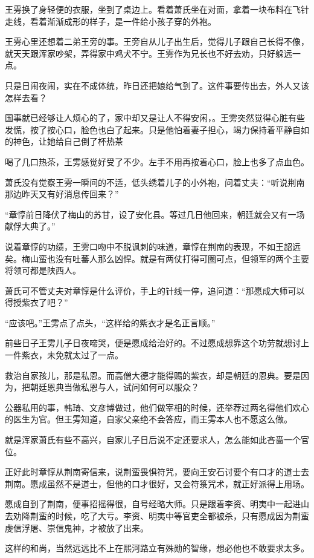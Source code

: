 王雱换了身轻便的衣服，坐到了桌边上。看着萧氏坐在对面，拿着一块布料在飞针走线，看着渐渐成形的样子，是一件给小孩子穿的外袍。

王雱心里还想着二弟王旁的事。王旁自从儿子出生后，觉得儿子跟自己长得不像，就天天跟浑家吵架，弄得家中鸡犬不宁。王雱作为兄长也不好去劝，只好躲远一点。

只是日闹夜闹，实在不成体统，昨日还把娘给气到了。这件事要传出去，外人又该怎样去看？

国事就已经够让人烦心的了，家中却又是让人不得安闲，。王雱突然觉得心脏有些发慌，按了按心口，脸色也白了起来。只是他怕着妻子担心，竭力保持着平静自如的神色，让她给自己倒了杯热茶

喝了几口热茶，王雱感觉好受了不少。左手不用再按着心口，脸上也多了点血色。

萧氏没有觉察王雱一瞬间的不适，低头绣着儿子的小外袍，问着丈夫：“听说荆南那边昨天又有好消息传回来？”

“章惇前日降伏了梅山的苏甘，设了安化县。等过几日他回来，朝廷就会又有一场献俘大典了。”

说着章惇的功绩，王雱口吻中不脱讽刺的味道，章惇在荆南的表现，不如王韶远矣。梅山蛮也没有吐蕃人那么凶悍。就是有两仗打得可圈可点，但领军的两个主要将领可都是陕西人。

萧氏可不管丈夫对章惇是什么评价，手上的针线一停，追问道：“那愿成大师可以得授紫衣了吧？”

“应该吧。”王雱点了点头，“这样给的紫衣才是名正言顺。”

前些日子王雱儿子日夜啼哭，便是愿成给治好的。不过愿成想靠这个功劳就想讨上一件紫衣，未免就太过了一点。

救治自家孩儿，那是私恩。而高僧大德才能得赐的紫衣，却是朝廷的恩典。要是因为，把朝廷恩典当做私恩与人，试问如何可以服众？

公器私用的事，韩琦、文彦博做过，他们做宰相的时候，还举荐过两名得他们欢心的医生为官。但王雱知道，自家父亲绝不会答应，而王雱本人也不愿这么做。

就是浑家萧氏有些不高兴，自家儿子日后说不定还要求人，怎么能如此吝啬一个官位。

正好此时章惇从荆南寄信来，说荆蛮畏惧符咒，要向王安石讨要个有口才的道士去荆南。愿成虽然不是道士，但他的口才很好，又会符箓咒术，就正好派得上用场。

愿成自到了荆南，便事招摇得很，自号经略大师。只是跟着李资、明夷中一起进山去劝降荆蛮的时候，吃了大亏。李资、明夷中等官吏全都被杀，只有愿成因为荆蛮虔信浮屠、崇信鬼神，才被放了出来。

这样的和尚，当然远远比不上在熙河路立有殊勋的智缘，想必他也不敢要求太多。

